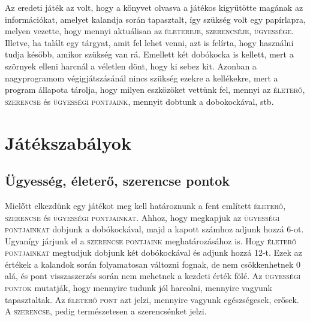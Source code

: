 \documentclass[12pt,a4paper,oneside]{report}
\newcommand{\stat}{\textsc}
\begin{document}
  Az eredeti játék az volt, hogy a könyvet olvasva a játékos
  kigyűtötte magának az információkat, amelyet kalandja során
  tapasztalt, így szükség volt egy papírlapra, melyen vezette, hogy
  mennyi aktuálisan az \stat{életereje}, \stat{szerencséje},
  \stat{ügyessége}. Illetve, ha talált egy tárgyat, amit fel lehet
  venni, azt is felírta, hogy használni tudja később, amikor szükség
  van rá. Emellett két dobókocka is kellett, mert a szörnyek elleni
  harcnál a véletlen dönt, hogy ki sebez kit. Azonban a nagyprogramom
  végigjátszásánál nincs szükség ezekre a kellékekre, mert a program
  állapota tárolja, hogy milyen eszközöket vettünk fel, mennyi az
  \stat{életerő}, \stat{szerencse} és \stat{ügyességi pontjaink},
  mennyit dobtunk a dobokockával, stb.
  

    \section{Játékszabályok}
  
      \subsection{Ügyesség, életerő, szerencse pontok}
        Mielőtt elkezdünk egy játékot meg kell határoznunk a fent
        említett \stat{életerő}, \stat{szerencse} és \stat{ügyességi
        pontjainkat}. Ahhoz, hogy megkapjuk az \stat{ügyességi
        pontjainkat} dobjunk a dobókockával, majd a kapott számhoz
        adjunk hozzá 6-ot. Ugyanígy járjunk el a \stat{szerencse
        pontjaink} meghatározásához is. Hogy \stat{életerő
        pontjainkat} megtudjuk dobjunk két dobókockával és adjunk
        hozzá 12-t. Ezek az értékek a kalandok során folyamatosan
        változni fognak, de nem csökkenhetnek 0 alá, és pont
        visszaszerzés során nem mehetnek a kezdeti érték fölé. Az
        \stat{ügyességi pontok} mutatják, hogy mennyire tudunk jól
        harcolni, mennyire vagyunk tapasztaltak. Az \stat{életerő
        pont} azt jelzi, mennyire vagyunk egészségesek, erősek. A
        \stat{szerencse}, pedig természetesen a szerencsénket jelzi.
    
\end{document}
